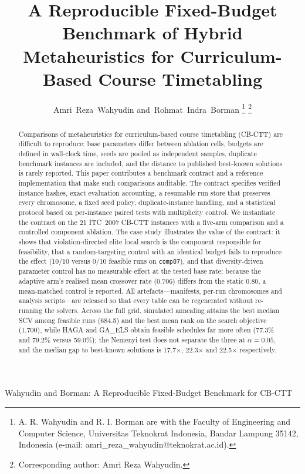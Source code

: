 \documentclass[journal]{IEEEtran}
\newcommand{\code}[1]{\texttt{#1}}
\begin{document}
\title{A Reproducible Fixed-Budget Benchmark of Hybrid Metaheuristics for Curriculum-Based Course Timetabling}

\author{Amri~Reza~Wahyudin
        and~Rohmat~Indra~Borman%
\thanks{A. R. Wahyudin and R. I. Borman are with the Faculty of Engineering and Computer Science, Universitas Teknokrat Indonesia, Bandar Lampung 35142, Indonesia (e-mail: amri\_reza\_wahyudin@teknokrat.ac.id).}%
\thanks{Corresponding author: Amri Reza Wahyudin.}%
}

%
{Wahyudin and Borman: A Reproducible Fixed-Budget Benchmark for CB-CTT}

\maketitle

\begin{abstract}
Comparisons of metaheuristics for curriculum-based course timetabling (CB-CTT) are difficult to reproduce: base parameters differ between ablation cells, budgets are defined in wall-clock time, seeds are pooled as independent samples, duplicate benchmark instances are included, and the distance to published best-known solutions is rarely reported. This paper contributes a benchmark contract and a reference implementation that make such comparisons auditable. The contract specifies verified instance hashes, exact evaluation accounting, a resumable run store that preserves every chromosome, a fixed seed policy, duplicate-instance handling, and a statistical protocol based on per-instance paired tests with multiplicity control. We instantiate the contract on the 21 ITC~2007 CB-CTT instances with a five-arm comparison and a controlled component ablation. The case study illustrates the value of the contract: it shows that violation-directed elite local search is the component responsible for feasibility, that a random-targeting control with an identical budget fails to reproduce the effect (10/10 versus 0/10 feasible runs on \code{comp07}), and that diversity-driven parameter control has no measurable effect at the tested base rate; because the adaptive arm's realised mean crossover rate (0.706) differs from the static 0.80, a mean-matched control is reported. All artefacts---manifests, per-run chromosomes and analysis scripts---are released so that every table can be regenerated without re-running the solvers. Across the full grid, simulated annealing attains the best median SCV among feasible runs (684.5) and the best mean rank on the search objective (1.700), while HAGA and GA\_ELS obtain feasible schedules far more often (77.3\% and 79.2\% versus 59.0\%); the Nemenyi test does not separate the three at $\alpha=0.05$, and the median gap to best-known solutions is 17.7$\times$, 22.3$\times$ and 22.5$\times$ respectively.
\end{abstract}
\end{document}
